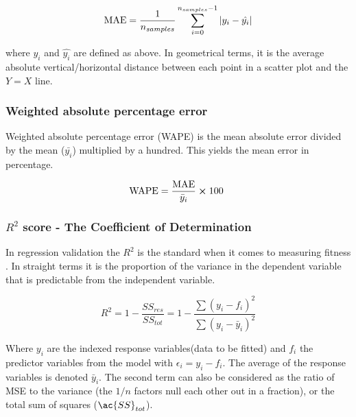 \begin{align}\label{eq:MAE}
\text{MAE} = \frac{1}{n_{samples}}\sum^{n_{samples}-1}_{i=0}\abs{y_i - \hat{y_i}}
\end{align}

where $y_i$ and $\hat{y_i}$ are defined as above. In geometrical terms, it is the average absolute vertical/horizontal distance between each point in a scatter plot and the $Y=X$ line.

\subsubsection{Weighted absolute percentage error}

Weighted absolute percentage error (\ac{WAPE}) is the mean absolute error divided by the mean ($\bar{y_i}$) multiplied by a hundred. This yields the mean error in percentage.

\begin{align}\label{eq:WAPE}
\text{WAPE} = \frac{\text{MAE}}{\bar{y}_{i}} \cross 100 
\end{align}



\subsubsection{$R^2$ score - The Coefficient of Determination}

	In regression validation the $R^2$ is the standard when it comes to measuring fitness \cite{james2013introduction}. In straight terms it is the proportion of the variance in the dependent variable that is predictable from the independent variable.

\begin{equation}\label{eq: R squared}
	R^2 =1 - \frac{SS_{res}}{SS_{tot}} =  1 - \frac{ \sum(y_i-f_i)^2 }{ \sum(y_i-\bar{y}_i)^2 }
\end{equation}

	Where $y_i$ are the indexed response variables(data to be fitted) and $f_i$ the predictor variables from the model with $\epsilon_i = y_i - f_i$. The average of the response variables is denoted $\bar{y}_i$. The second term can also be considered as the ratio of MSE to the variance (the $1/n$ factors null each other out in a fraction), or the total sum of squares ($\ac{SS}_{tot}$).
	
